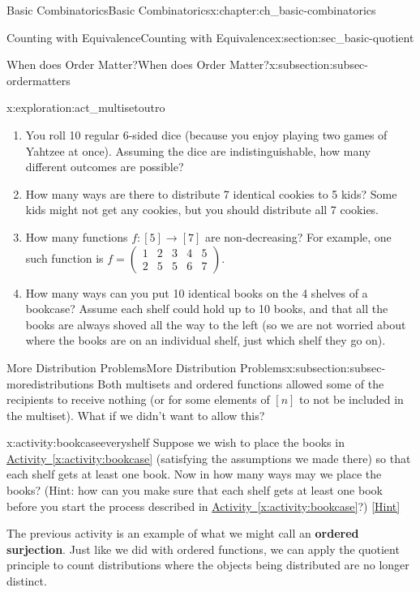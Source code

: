 \documentclass[oneside,10pt,]{book}
\newcommand{\terminology}[1]{\textbf{#1}}
\numberwithin{equation}{chapter}
\newcommand{\twoline}[2]{\begin{pmatrix}#1 \\ #2 \end{pmatrix}}
\newcommand{\amp}{&}
\begin{document}
\begin{chapterptx}{Basic Combinatorics}{}{Basic Combinatorics}{}{}{x:chapter:ch_basic-combinatorics}
\begin{sectionptx}{Counting with Equivalence}{}{Counting with Equivalence}{}{}{x:section:sec_basic-quotient}
\begin{subsectionptx}{When does Order Matter?}{}{When does Order Matter?}{}{}{x:subsection:subsec-ordermatters}
\begin{exploration}{}{x:exploration:act_multisetoutro}
\begin{enumerate}[font=\bfseries,label=(\alph*),ref=\alph*]
\item{}You roll 10 regular 6-sided dice (because you enjoy playing two games of Yahtzee at once).  Assuming the dice are indistinguishable, how many different outcomes are possible?%
\item{}How many ways are there to distribute 7 identical cookies to 5 kids? Some kids might not get any cookies, but you should distribute all 7 cookies.%
\item{}How many functions \(f:[5] \to [7]\) are non-decreasing?  For example, one such function is \(f = \twoline{1 \amp 2 \amp 3 \amp 4 \amp 5}{2 \amp 5 \amp 5 \amp 6 \amp 7}\).%
\item{}How many ways can you put 10 identical books on the 4 shelves of a bookcase?  Assume each shelf could hold up to 10 books, and that all the books are always shoved all the way to the left (so we are not worried about where the books are on an individual shelf, just which shelf they go on).%
\end{enumerate}
\end{exploration}
\end{subsectionptx}
%
%
\typeout{************************************************}
\typeout{************************************************}
%
\begin{subsectionptx}{More Distribution Problems}{}{More Distribution Problems}{}{}{x:subsection:subsec-moredistributions}
Both multisets and ordered functions allowed some of the recipients to receive nothing (or for some elements of \([n]\) to not be included in the multiset).  What if we didn't want to allow this?%
\begin{activity}{}{x:activity:bookcaseeveryshelf}%
Suppose we wish to place the books in \hyperref[x:activity:bookcase]{Activity~\ref{x:activity:bookcase}} (satisfying the assumptions we made there) so that each shelf gets at least one book. Now in how many ways may we place the books? (Hint: how can you make sure that each shelf gets at least one book before you start the process described in \hyperref[x:activity:bookcase]{Activity~\ref{x:activity:bookcase}}?)%
\space\hspace*{0pt}\hfill{\tiny\hyperlink{g:hint:idm2476-back}{[Hint]}}\end{activity}
The previous activity is an example of what we might call an \terminology{ordered surjection}.  Just like we did with ordered functions, we can apply the quotient principle to count distributions where the objects being distributed are no longer distinct.%

\end{subsectionptx}
\end{sectionptx}
\end{chapterptx}
\end{document}
